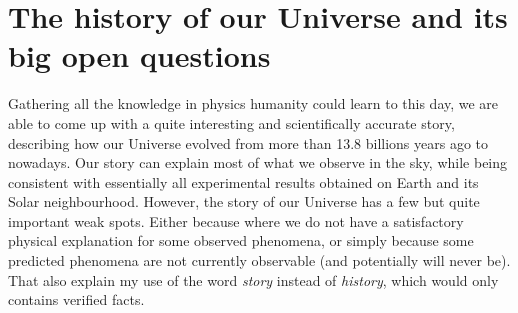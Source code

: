 
\vspace{1em}



\section{The history of our Universe and its big open questions}
\label{intro:history_questions}

    Gathering all the knowledge in physics humanity could learn to this day, 
    we are able to come up with a quite interesting and scientifically accurate story,
    describing how our Universe evolved from more than 13.8 billions years ago to nowadays. 
    Our story can explain most of what we observe in the sky, 
    while being consistent with essentially all experimental results obtained on Earth 
    and its Solar neighbourhood.  
    However, the story of our Universe has a few but quite important weak spots. 
    Either because where we do not have 
    a satisfactory physical explanation for some observed phenomena, 
    or simply because some predicted phenomena are not currently observable
    (and potentially will never be).
    That also explain my use of the word \emph{story} instead of \emph{history}, 
    which would only contains verified facts. 

